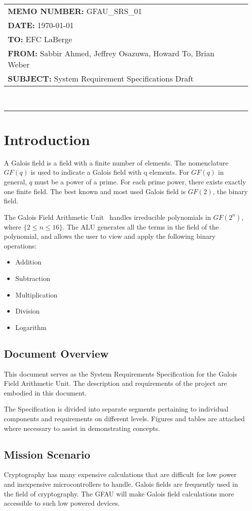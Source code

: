 \documentclass[paper=usletter, fontsize=12pt]{article}
\newcommand{\team}{Galois Field Arithmetic Unit}
\newcommand{\Sabbir}{Sabbir Ahmed}
\newcommand{\Jeffrey}{Jeffrey Osazuwa}
\newcommand{\Howard}{Howard To}
\newcommand{\Brian}{Brian Weber}
\newcommand{\documentinfo}[5]{
    \begin{centering}
        \parbox{2in}{
        \begin{spacing}{1}
            \begin{flushleft}
                \begin{tabular}{l l}
                    #1 \\
                    #2 \\
                    #3 \\
                    #4 \\
                    #5 \\
                \end{tabular}\\
                \rule{\textwidth}{1pt}
            \end{flushleft}
        \end{spacing}
        }
    \end{centering}
}
\begin{document}
    \documentinfo
    {\textbf{MEMO NUMBER:} GFAU\_SRS\_01}
    {\textbf{DATE:} \today}
    {\textbf{TO: } EFC LaBerge}
    {\textbf{FROM: }\Sabbir, \Jeffrey, \Howard, \Brian}
    {\textbf{SUBJECT: } System Requirement Specifications Draft}
    \vspace{-0.1in}

    \section{Introduction}
    A Galois field is a field with a finite number of elements. The nomenclature $GF(q)$ is used to indicate a Galois field with q elements. For $GF(q)$ in general, $q$ must be a power of a prime. For each prime power, there exists exactly one finite field. The best known and most used Galois field is $GF(2)$, the binary field.

    The \team~ handles irreducible polynomials in $GF(2^n)$, where $\{2 \leq n \leq 16\}$. The ALU generates all the terms in the field of the polynomial, and allows the user to view and apply the following binary operations:

    \begin{itemize}

        \item Addition
        \item Subtraction
        \item Multiplication
        \item Division
        \item Logarithm

    \end{itemize}

        \subsection{Document Overview}
        This document serves as the System Requirements Specification for the Galois Field Arithmetic Unit. The description and requirements of the project are embodied in this document.

        The Specification is divided into separate segments pertaining to individual components and requirements on different levels. Figures and tables are attached where necessary to assist in demonstrating concepts.

        \subsection{Mission Scenario}
        Cryptography has many expensive calculations that are difficult for low power and inexpensive microcontrollers to handle. Galois fields are frequently used in the field of cryptography. The GFAU will make Galois field calculations more accessible to such low powered devices.
\end{document}
